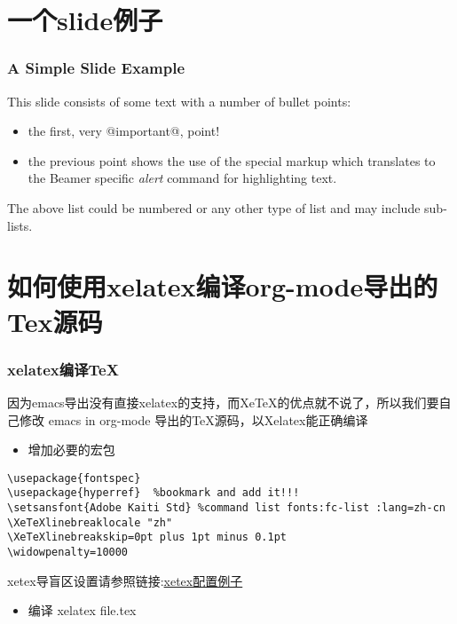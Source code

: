 \documentclass[bigger]{beamer}
\begin{document}
\section{一个slide例子}
\label{sec-3}
\begin{frame}
\frametitle{A Simple Slide Example}
\label{sec-3-1}

This slide consists of some text with a number of bullet points:

\begin{itemize}
\item the first, very @important@, point!
\item the previous point shows the use of the special markup which
  translates to the Beamer specific \emph{alert} command for highlighting
  text.
\end{itemize}


The above list could be numbered or any other type of list and may
include sub-lists.
\end{frame}
\section{如何使用xelatex编译org-mode导出的Tex源码}
\label{sec-4}
\begin{frame}[fragile]
\frametitle{xelatex编译\TeX{}}
\label{sec-4-1}

因为emacs导出没有直接xelatex的支持，而XeTeX的优点就不说了，所以我们要自己修改
emacs in org-mode 导出的\TeX{}源码，以Xelatex能正确编译
\begin{itemize}
\item 增加必要的宏包
\end{itemize}

\begin{verbatim}
\usepackage{fontspec}
\usepackage{hyperref}  %bookmark and add it!!!
\setsansfont{Adobe Kaiti Std} %command list fonts:fc-list :lang=zh-cn
\XeTeXlinebreaklocale "zh"
\XeTeXlinebreakskip=0pt plus 1pt minus 0.1pt
\widowpenalty=10000
\end{verbatim}


xetex导盲区设置请参照链接:\href{https://github.com/live5156go51/code/blob/master/Tex/moderncv/resume.tex}{xetex配置例子}
\begin{itemize}
\item 编译 xelatex file.tex
\end{itemize}
\end{frame}
\end{document}
